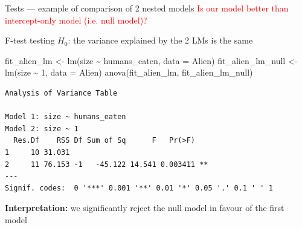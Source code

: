 \documentclass[
  10pt,
  ignorenonframetext,
  aspectratio=169,
  t]{beamer}
\newenvironment{Shaded}{\begin{snugshade}}{\end{snugshade}}
\newcommand{\AttributeTok}[1]{\textcolor[rgb]{0.40,0.45,0.13}{#1}}
\newcommand{\DecValTok}[1]{\textcolor[rgb]{0.68,0.00,0.00}{#1}}
\newcommand{\FunctionTok}[1]{\textcolor[rgb]{0.28,0.35,0.67}{#1}}
\newcommand{\NormalTok}[1]{\textcolor[rgb]{0.00,0.23,0.31}{#1}}
\newcommand{\OtherTok}[1]{\textcolor[rgb]{0.00,0.23,0.31}{#1}}
\newcommand{\SpecialCharTok}[1]{\textcolor[rgb]{0.37,0.37,0.37}{#1}}
\newcommand{\bluebold}[1]{\textcolor{bluebeamer}{\textbf{#1}}}
\begin{document}
\begin{frame}[fragile]{Tests --- example of comparison of 2 nested
models}
\protect{}\label{tests-example-of-comparison-of-2-nested-models}
\textcolor{red}{Is our model better than intercept-only model (i.e. null model)?}

F-test testing \(H_0\): the variance explained by the 2 LMs is the same

\footnotesize

\begin{Shaded}
\begin{Highlighting}[]
\NormalTok{fit\_alien\_lm      }\OtherTok{\textless{}{-}} \FunctionTok{lm}\NormalTok{(size }\SpecialCharTok{\textasciitilde{}}\NormalTok{ humans\_eaten, }\AttributeTok{data =}\NormalTok{ Alien)}
\NormalTok{fit\_alien\_lm\_null }\OtherTok{\textless{}{-}} \FunctionTok{lm}\NormalTok{(size }\SpecialCharTok{\textasciitilde{}} \DecValTok{1}\NormalTok{, }\AttributeTok{data =}\NormalTok{ Alien)}
\FunctionTok{anova}\NormalTok{(fit\_alien\_lm, fit\_alien\_lm\_null)}
\end{Highlighting}
\end{Shaded}

\begin{verbatim}
Analysis of Variance Table

Model 1: size ~ humans_eaten
Model 2: size ~ 1
  Res.Df    RSS Df Sum of Sq      F   Pr(>F)   
1     10 31.031                                
2     11 76.153 -1   -45.122 14.541 0.003411 **
---
Signif. codes:  0 '***' 0.001 '**' 0.01 '*' 0.05 '.' 0.1 ' ' 1
\end{verbatim}

\normalsize

\pause

\bluebold{Interpretation:} we significantly reject the null model in
favour of the first model
\end{frame}
\end{document}
